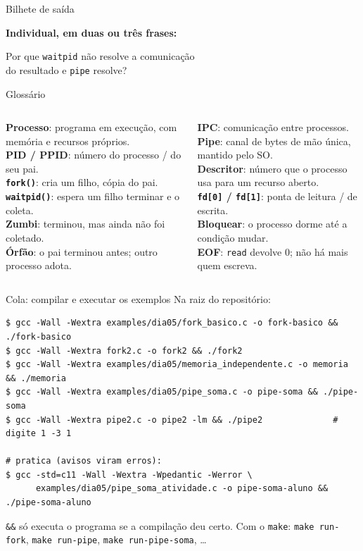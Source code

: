 \documentclass[aspectratio=169]{beamer}
\begin{document}
\begin{frame}{Bilhete de saída}
\begin{center}
{\large \textbf{Individual, em duas ou três frases:}}

\vspace{1em}
{\Large Por que \texttt{waitpid} não resolve a comunicação\\[0.2em] do resultado e \texttt{pipe} resolve?}
\end{center}
\end{frame}

\begin{frame}{Glossário}
\small
\begin{columns}[T]
\textbf{Processo}: programa em execução, com memória e recursos próprios.\\[0.35em]
\textbf{PID / PPID}: número do processo / do seu pai.\\[0.35em]
\textbf{\texttt{fork()}}: cria um filho, cópia do pai.\\[0.35em]
\textbf{\texttt{waitpid()}}: espera um filho terminar e o coleta.\\[0.35em]
\textbf{Zumbi}: terminou, mas ainda não foi coletado.\\[0.35em]
\textbf{Órfão}: o pai terminou antes; outro processo adota.

\textbf{IPC}: comunicação entre processos.\\[0.35em]
\textbf{Pipe}: canal de bytes de mão única, mantido pelo SO.\\[0.35em]
\textbf{Descritor}: número que o processo usa para um recurso aberto.\\[0.35em]
\textbf{\texttt{fd[0]} / \texttt{fd[1]}}: ponta de leitura / de escrita.\\[0.35em]
\textbf{Bloquear}: o processo dorme até a condição mudar.\\[0.35em]
\textbf{EOF}: \texttt{read} devolve 0; não há mais quem escreva.
\end{columns}
\end{frame}

\begin{frame}[fragile]{Cola: compilar e executar os exemplos}
\small Na raiz do repositório:
\begin{lstlisting}[style=terminal, basicstyle=\ttfamily\scriptsize\color{termfg}]
$ gcc -Wall -Wextra examples/dia05/fork_basico.c -o fork-basico && ./fork-basico
$ gcc -Wall -Wextra fork2.c -o fork2 && ./fork2
$ gcc -Wall -Wextra examples/dia05/memoria_independente.c -o memoria && ./memoria
$ gcc -Wall -Wextra examples/dia05/pipe_soma.c -o pipe-soma && ./pipe-soma
$ gcc -Wall -Wextra pipe2.c -o pipe2 -lm && ./pipe2              # digite 1 -3 1

# pratica (avisos viram erros):
$ gcc -std=c11 -Wall -Wextra -Wpedantic -Werror \
      examples/dia05/pipe_soma_atividade.c -o pipe-soma-aluno && ./pipe-soma-aluno
\end{lstlisting}

\small \texttt{\&\&} só executa o programa se a compilação deu certo. Com o \texttt{make}: \texttt{make run-fork}, \texttt{make run-pipe}, \texttt{make run-pipe-soma}, \ldots
\end{frame}
\end{document}
